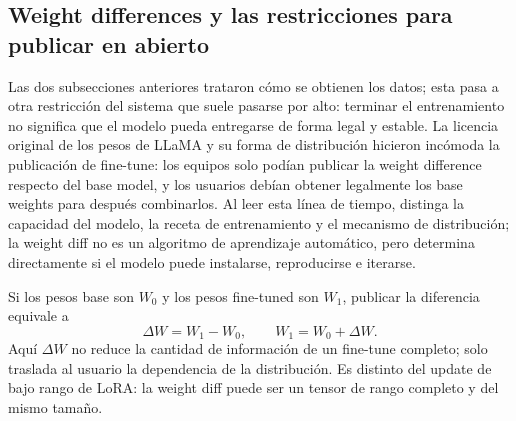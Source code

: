 
\subsection{Weight differences y las restricciones para publicar en abierto}

Las dos subsecciones anteriores trataron cómo se obtienen los datos; esta pasa a otra restricción del sistema que suele pasarse por alto: terminar el entrenamiento no significa que el modelo pueda entregarse de forma legal y estable. La licencia original de los pesos de LLaMA y su forma de distribución hicieron incómoda la publicación de fine-tune: los equipos solo podían publicar la weight difference respecto del base model, y los usuarios debían obtener legalmente los base weights para después combinarlos. Al leer esta línea de tiempo, distinga la capacidad del modelo, la receta de entrenamiento y el mecanismo de distribución; la weight diff no es un algoritmo de aprendizaje automático, pero determina directamente si el modelo puede instalarse, reproducirse e iterarse.



Si los pesos base son $W_0$ y los pesos fine-tuned son $W_1$, publicar la diferencia equivale a
\[
\Delta W=W_1-W_0,\qquad W_1=W_0+\Delta W.
\]
Aquí $\Delta W$ no reduce la cantidad de información de un fine-tune completo; solo traslada al usuario la dependencia de la distribución. Es distinto del update de bajo rango de LoRA: la weight diff puede ser un tensor de rango completo y del mismo tamaño.



